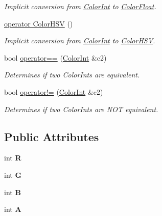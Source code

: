 \begin{DoxyCompactItemize}
\begin{DoxyCompactList}\small\item\em Implicit conversion from \hyperlink{structtsgl_1_1_color_int}{Color\+Int} to \hyperlink{structtsgl_1_1_color_float}{Color\+Float}. \end{DoxyCompactList}\item 
\hyperlink{structtsgl_1_1_color_int_acbd82ad2c6388389aa3474f042a25353}{operator Color\+H\+S\+V} ()
\begin{DoxyCompactList}\small\item\em Implicit conversion from \hyperlink{structtsgl_1_1_color_int}{Color\+Int} to \hyperlink{structtsgl_1_1_color_h_s_v}{Color\+H\+S\+V}. \end{DoxyCompactList}\item 
bool \hyperlink{structtsgl_1_1_color_int_a7d6282c79f42d4ba9a70c4475b8170c2}{operator==} (\hyperlink{structtsgl_1_1_color_int}{Color\+Int} \&c2)
\begin{DoxyCompactList}\small\item\em Determines if two Color\+Ints are equivalent. \end{DoxyCompactList}\item 
bool \hyperlink{structtsgl_1_1_color_int_af83865a1b76eb8c0a5e0fe4bc34fab2d}{operator!=} (\hyperlink{structtsgl_1_1_color_int}{Color\+Int} \&c2)
\begin{DoxyCompactList}\small\item\em Determines if two Color\+Ints are {\itshape N\+O\+T} equivalent. \end{DoxyCompactList}\end{DoxyCompactItemize}
\subsection*{Public Attributes}
\begin{DoxyCompactItemize}
\item 
\hypertarget{structtsgl_1_1_color_int_a72ab1d2040360a98871f96bccdc85da6}{}int {\bfseries R}\label{structtsgl_1_1_color_int_a72ab1d2040360a98871f96bccdc85da6}

\item 
\hypertarget{structtsgl_1_1_color_int_a031a5d8f7e402908648ed67d04341796}{}int {\bfseries G}\label{structtsgl_1_1_color_int_a031a5d8f7e402908648ed67d04341796}

\item 
\hypertarget{structtsgl_1_1_color_int_a3f8bc859cdf8167c3aaaabb493301ea8}{}int {\bfseries B}\label{structtsgl_1_1_color_int_a3f8bc859cdf8167c3aaaabb493301ea8}

\item 
\hypertarget{structtsgl_1_1_color_int_af095bf47ede3084b3d0b4ca5e5638ce3}{}int {\bfseries A}\label{structtsgl_1_1_color_int_af095bf47ede3084b3d0b4ca5e5638ce3}

\end{DoxyCompactItemize}


